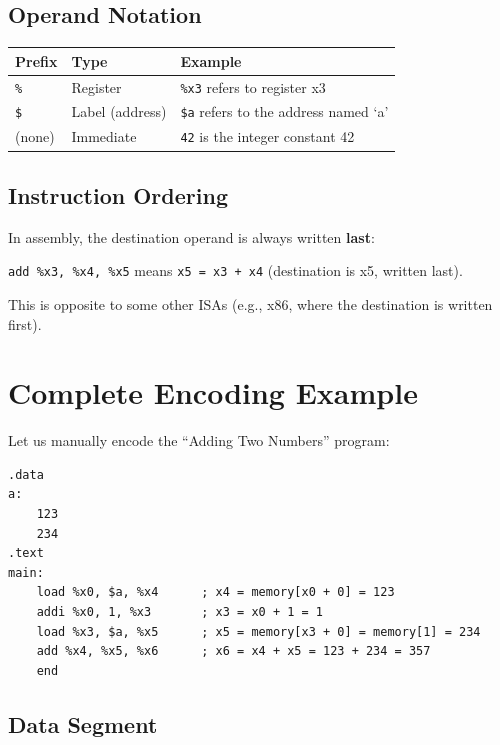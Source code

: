\documentclass[12pt,a4paper]{article}
\begin{document}
\subsection{Operand Notation}

\begin{longtable}{p{3cm}p{3cm}p{7cm}}
\toprule
\textbf{Prefix} & \textbf{Type} & \textbf{Example} \\
\midrule
\texttt{\%} & Register & \texttt{\%x3} refers to register x3 \\
\texttt{\$} & Label (address) & \texttt{\$a} refers to the address named `a' \\
(none) & Immediate & \texttt{42} is the integer constant 42 \\
\bottomrule
\end{longtable}

\subsection{Instruction Ordering}

In assembly, the destination operand is always written \textbf{last}:

\texttt{add \%x3, \%x4, \%x5} means \texttt{x5 = x3 + x4} (destination is x5, written last).

This is opposite to some other ISAs (e.g., x86, where the destination is written first).

\section{Complete Encoding Example}

Let us manually encode the ``Adding Two Numbers'' program:

\begin{lstlisting}[style=asmstyle, caption={Adding Two Numbers}]
.data
a:
    123
    234
.text
main:
    load %x0, $a, %x4      ; x4 = memory[x0 + 0] = 123
    addi %x0, 1, %x3       ; x3 = x0 + 1 = 1
    load %x3, $a, %x5      ; x5 = memory[x3 + 0] = memory[1] = 234
    add %x4, %x5, %x6      ; x6 = x4 + x5 = 123 + 234 = 357
    end
\end{lstlisting}

\subsection{Data Segment}
\end{document}
